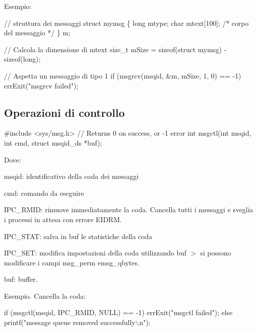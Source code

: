 Esempio\+: 
\begin{DoxyCode}
\textcolor{comment}{// struttura dei messaggi}
\textcolor{keyword}{struct }mymsg \{
    \textcolor{keywordtype}{long} mtype;
    \textcolor{keywordtype}{char} mtext[100]; \textcolor{comment}{/* corpo del messaggio */}
\} m;

\textcolor{comment}{// Calcola la dimensione di mtext}
\textcolor{keywordtype}{size\_t} mSize = \textcolor{keyword}{sizeof}(\textcolor{keyword}{struct }mymsg) - sizeof(long);

\textcolor{comment}{// Aspetta un messaggio di tipo 1}
\textcolor{keywordflow}{if} (msgrcv(msqid, &m, mSize, 1, 0) == -1)
    errExit(\textcolor{stringliteral}{"msgrcv failed"});
\end{DoxyCode}


\subsection*{Operazioni di controllo}


\begin{DoxyCode}
\textcolor{preprocessor}{#include <sys/msg.h>}
\textcolor{comment}{// Returns 0 on success, or -1 error}
\textcolor{keywordtype}{int} msgctl(\textcolor{keywordtype}{int} msqid, \textcolor{keywordtype}{int} cmd, \textcolor{keyword}{struct} msqid\_ds *buf);
\end{DoxyCode}


Dove\+:
\begin{DoxyItemize}
\item {\ttfamily msqid}\+: identificativo della coda dei messaggi
\item {\ttfamily cmd}\+: comando da eseguire
\begin{DoxyItemize}
\item {\ttfamily I\+P\+C\+\_\+\+R\+M\+ID}\+: rimuove immediatamente la coda. Cancella tutti i messaggi e sveglia i processi in attesa con errore E\+I\+D\+RM.
\item {\ttfamily I\+P\+C\+\_\+\+S\+T\+AT}\+: salva in {\ttfamily buf} le statistiche della coda
\item {\ttfamily I\+P\+C\+\_\+\+S\+ET}\+: modifica impostazioni della coda utilizzando {\ttfamily buf} $>$ si possono modificare i campi {\ttfamily msg\+\_\+perm} e{\ttfamily msg\+\_\+qbytes}.
\end{DoxyItemize}
\item {\ttfamily buf}\+: buffer.
\end{DoxyItemize}

Esempio. Cancella la coda\+: 
\begin{DoxyCode}
\textcolor{keywordflow}{if} (msgctl(msqid, IPC\_RMID, NULL) == -1)
    errExit(\textcolor{stringliteral}{"msgctl failed"});
\textcolor{keywordflow}{else}
    printf(\textcolor{stringliteral}{"message queue removed successfully\(\backslash\)n"});
\end{DoxyCode}



